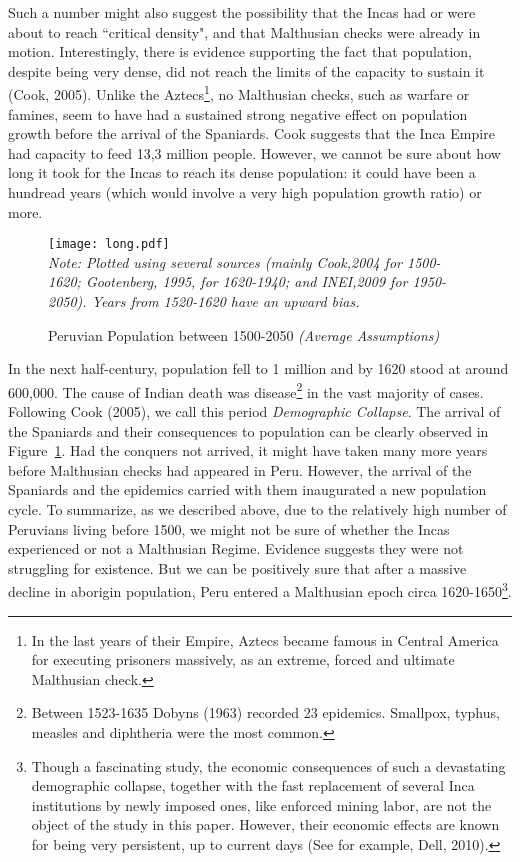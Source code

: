 \documentclass[12pt]{article}%
\begin{document}
Such a number might also suggest the possibility that the Incas had or were about to reach ``critical density", and that Malthusian checks were already in motion. Interestingly, there is evidence supporting the fact that population, despite being very dense, did not reach the limits of the capacity to sustain it (Cook, 2005). Unlike the Aztecs\footnote{In the last years of their Empire, Aztecs became famous in Central America for executing prisoners massively, as an extreme, forced and ultimate Malthusian check.}, no Malthusian checks, such as warfare or famines, seem to have had a sustained strong negative effect on population growth before the arrival of the Spaniards. Cook suggests that the Inca Empire had capacity to feed 13,3 million people. However, we cannot be sure about how long it took for the Incas to reach its dense population: it could have been a hundread years (which would involve a very high population growth ratio) or more.
\begin{figure}[h]
\caption{Peruvian Population between 1500-2050 \emph{(Average Assumptions)}}
\centering
\texttt{[image: long.pdf]} \\
\footnotesize
\textit{Note: Plotted using several sources (mainly Cook,2004 for 1500-1620; Gootenberg, 1995, for 1620-1940; and INEI,2009 for 1950-2050). Years from 1520-1620 have an upward bias.}
\label{tfrandle}
\end{figure}
In the next half-century, population fell to 1 million and by 1620 stood at around 600,000. The cause of Indian death was disease\footnote{Between 1523-1635 Dobyns (1963) recorded 23 epidemics. Smallpox, typhus, measles and diphtheria were the most common.} in the vast majority of cases. Following Cook (2005), we call this period \emph{Demographic Collapse}. The arrival of the Spaniards and their consequences to population can be clearly observed in Figure~\ref{tfrandle}. Had the conquers not arrived, it might have taken many more years before Malthusian checks had appeared in Peru. However, the arrival of the Spaniards and the epidemics carried with them inaugurated a new population cycle. To summarize, as we described above, due to the relatively high number of Peruvians living before 1500, we might not be sure of whether the Incas experienced or not a Malthusian Regime. Evidence suggests they were not struggling for existence. But we can be positively sure that after a massive decline in aborigin population, Peru entered a Malthusian epoch circa 1620-1650\footnote{Though a fascinating study, the economic consequences of such a devastating demographic collapse, together with the fast replacement of several Inca institutions by newly imposed ones, like enforced mining labor, are not the object of the study in this paper. However, their economic effects are known for being very persistent, up to current days (See for example, Dell, 2010).}.
\end{document}
